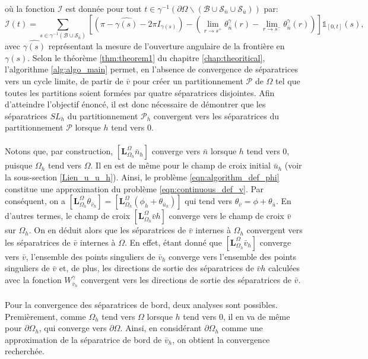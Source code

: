 où la fonction $\mathcal{I}$ est donnée pour tout $t\in\gamma^{-1}(\partial\Omega\backslash(\mathcal{B}\cup\mathcal{S}_{\bar{n}}\cup\mathcal{S}_{\bar{u}}))$ par:
$$
\mathcal{I}(t)=\sum_{s\in\gamma^{-1}(\mathcal{B}\cup\mathcal{S}_{\bar{n}})}\left[\left(\pi-\widehat{\gamma(s)}-2\pi I_{\gamma(s)}\right)-\left(\lim\limits_{r\rightarrow s^+}\theta^{\gamma}_{\bar{n}}(r) - \lim\limits_{r\rightarrow s^-}\theta^{\gamma}_{\bar{n}}(r)\right)\right]\mathbb{1}_{[0, t]}(s),
$$
avec $\widehat{\gamma(s)}$ représentant la mesure de l'ouverture angulaire de la frontière en $\gamma(s)$. Selon le théorème \ref{thm:theorem1} du chapitre \ref{chap:theoritical}, l'algorithme \ref{alg:algo_main} permet, en l'absence de convergence de séparatrices vers un cycle limite, de partir de $\bar{v}$ pour créer un partitionnement $\mathcal{P}$ de $\Omega$ tel que toutes les partitions soient formées par quatre séparatrices disjointes. Afin d'atteindre l'objectif énoncé, il est donc nécessaire de démontrer que les séparatrices $SL_h$ du partitionnement $\mathcal{P}_h$ convergent vers les séparatrices du partitionnement $\mathcal{P}$ lorsque $h$ tend vers $0$.\\\\
 Notons que, par construction, $[\mathbf{L}_{\Omega_h}^{\Omega}\bar{n}_h]$ converge vers $\bar{n}$ lorsque $h$ tend vers 0, puisque $\Omega_h$ tend vers $\Omega$. Il en est de même pour le champ de croix initial $\bar{u}_h$ (voir la sous-section \ref{Lien_u_u_h}). Ainsi, le problème \eqref{eqn:algorithm_def_phi} constitue une approximation du problème \eqref{eqn:continuous_def_v}. Par conséquent, on a $[\mathbf{L}_{\Omega_h}^{\Omega}\theta_{\bar{v}_h}]=[\mathbf{L}_{\Omega_h}^{\Omega}(\phi_h+\theta_{\bar{u}_h})]$ qui tend vers $\theta_{\bar{v}}=\phi+\theta_{\bar{u}}$. En d'autres termes, le champ de croix $[\mathbf{L}_{\Omega_h}^{\Omega}\bar{v}h]$ converge vers le champ de croix $\bar{v}$ sur $\Omega_h$. On en déduit alors que les séparatrices de $\bar{v}$ internes à $\Omega_h$ convergent vers les séparatrices de $\bar{v}$ internes à $\Omega$. En effet, étant donné que $[\mathbf{L}_{\Omega_h}^{\Omega}\bar{v}_h]$ converge vers $\bar{v}$, l'ensemble des points singuliers de $\bar{v}_h$ converge vers l'ensemble des points singuliers de $\bar{v}$ et, de plus, les directions de sortie des séparatrices de $\bar{v}h$ calculées avec la fonction $W^\gamma_{\bar{v}_h}$ convergent vers les directions de sortie des séparatrices de $\bar{v}$.\\\\
 Pour la convergence des séparatrices de bord, deux analyses sont possibles. Premièrement, comme $\Omega_h$ tend vers $\Omega$ lorsque $h$ tend vers 0, il en va de même pour $\partial\Omega_h$, qui converge vers $\partial\Omega$. Ainsi, en considérant $\partial\Omega_h$ comme une approximation de la séparatrice de bord de $\bar{v}_h$, on obtient la convergence recherchée.\\\\
